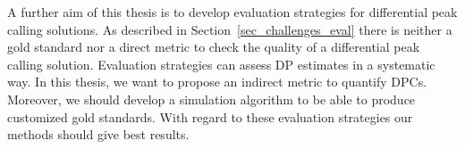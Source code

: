 A further aim of this thesis is to develop evaluation strategies for differential peak calling solutions.
As described in Section~\ref{sec_challenges_eval} there is neither a gold standard nor a direct metric to check the quality of a differential peak calling solution.
Evaluation strategies can assess DP estimates in a systematic way.
In this thesis, we want to propose an indirect metric to quantify DPCs.
Moreover, we should develop a simulation algorithm to be able to produce customized gold standards.
With regard to these evaluation strategies our methods should give best results.







